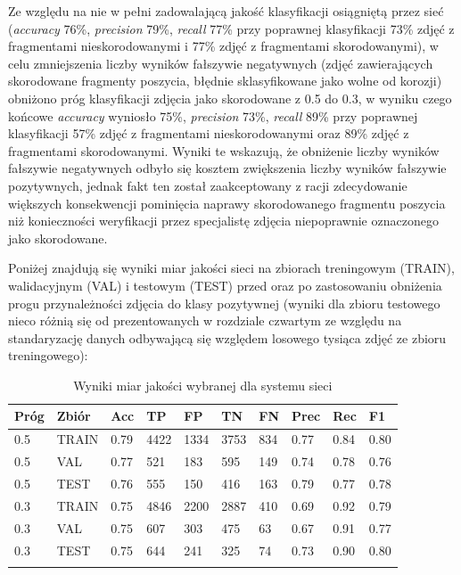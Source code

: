 \documentclass[polish,12pt]{aghthesis}
\begin{document}
\par Ze względu na nie w pełni zadowalającą jakość klasyfikacji osiągniętą przez sieć (\textit{accuracy} 76\%, \textit{precision} 79\%, \textit{recall} 77\% przy poprawnej klasyfikacji 73\% zdjęć z fragmentami nieskorodowanymi i 77\% zdjęć z fragmentami skorodowanymi), w celu zmniejszenia liczby wyników fałszywie negatywnych (zdjęć zawierających skorodowane fragmenty poszycia, błędnie sklasyfikowane jako wolne od korozji) obniżono próg klasyfikacji zdjęcia jako skorodowane z 0.5 do 0.3, w wyniku czego końcowe \textit{accuracy} wyniosło 75\%, \textit{precision} 73\%, \textit{recall} 89\% przy poprawnej klasyfikacji 57\% zdjęć z fragmentami nieskorodowanymi oraz 89\% zdjęć z fragmentami skorodowanymi. Wyniki te wskazują, że obniżenie liczby wyników fałszywie negatywnych odbyło się kosztem zwiększenia liczby wyników fałszywie pozytywnych, jednak fakt ten został zaakceptowany z racji zdecydowanie większych konsekwencji pominięcia naprawy skorodowanego fragmentu poszycia niż konieczności weryfikacji przez specjalistę zdjęcia niepoprawnie oznaczonego jako skorodowane.

\par Poniżej znajdują się wyniki miar jakości sieci na zbiorach treningowym (TRAIN), walidacyjnym (VAL) i testowym (TEST) przed oraz po zastosowaniu obniżenia progu przynależności zdjęcia do klasy pozytywnej (wyniki dla zbioru testowego nieco różnią się od prezentowanych w rozdziale czwartym ze względu na standaryzację danych odbywającą się względem losowego tysiąca zdjęć ze zbioru treningowego):

\renewcommand{\arraystretch}{1.7}
\begin{longtable}[h!]{|m{1.2cm}|m{1.5cm}|m{1.2cm}|m{1.2cm}|m{1.2cm}|m{1.2cm}|m{1.2cm}|m{1.2cm}|m{1.2cm}|m{1.2cm}|}
\hline
Próg & Zbiór & Acc & TP & FP & TN & FN & Prec & Rec & F1\\
\hline
0.5 & TRAIN & 0.79 & 4422 & 1334 & 3753 & 834 & 0.77 & 0.84 & 0.80\\
\hline
0.5 & VAL & 0.77 & 521 & 183 & 595 & 149 & 0.74 & 0.78 & 0.76\\
\hline
0.5 & TEST & 0.76 & 555 & 150 & 416 & 163 & 0.79 & 0.77 & 0.78\\
\hline
0.3 & TRAIN & 0.75 & 4846 & 2200 & 2887 & 410 & 0.69 & 0.92 & 0.79\\
\hline
0.3 & VAL & 0.75 & 607 & 303 & 475 & 63 & 0.67 & 0.91 & 0.77\\
\hline
0.3 & TEST & 0.75 & 644 & 241 & 325 & 74 & 0.73 & 0.90 & 0.80\\
\hline
\caption{Wyniki miar jakości wybranej dla systemu sieci}
\label{table:46}
\end{longtable}
\end{document}
